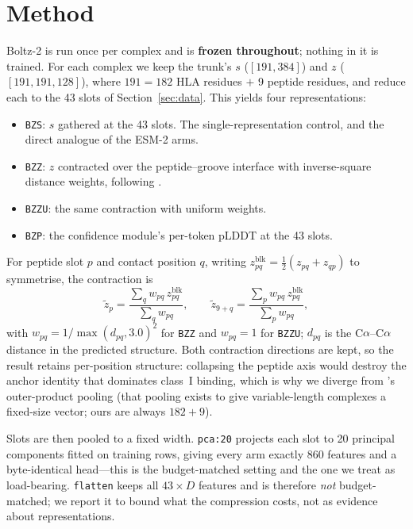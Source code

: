 \documentclass[11pt,a4paper]{article}
\newcommand{\armbzs}{\texttt{BZS}}
\newcommand{\armbzz}{\texttt{BZZ}}
\newcommand{\armbzzu}{\texttt{BZZU}}
\newcommand{\armbzp}{\texttt{BZP}}
\begin{document}
\section{Method}
\label{sec:method}

Boltz-2 is run once per complex and is \textbf{frozen throughout}; nothing in it
is trained. For each complex we keep the trunk's $s$ ($[191, 384]$) and $z$
($[191, 191, 128]$), where $191 = 182$ HLA residues $+$ 9 peptide residues, and
reduce each to the 43 slots of Section~\ref{sec:data}. This yields four
representations:

\begin{itemize}
  \item \armbzs{}: $s$ gathered at the 43 slots. The single-representation
        control, and the direct analogue of the ESM-2 arms.
  \item \armbzz{}: $z$ contracted over the peptide--groove interface with
        inverse-square distance weights, following \citet{prefolddg}.
  \item \armbzzu{}: the same contraction with uniform weights.
  \item \armbzp{}: the confidence module's per-token pLDDT at the 43 slots.
\end{itemize}

For peptide slot $p$ and contact position $q$, writing
$z^{\mathrm{blk}}_{pq} = \tfrac{1}{2}(z_{p q} + z_{q p})$ to symmetrise, the
contraction is
\begin{equation}
  \tilde z_p = \frac{\sum_q w_{pq}\, z^{\mathrm{blk}}_{pq}}{\sum_q w_{pq}},
  \qquad
  \tilde z_{9+q} = \frac{\sum_p w_{pq}\, z^{\mathrm{blk}}_{pq}}{\sum_p w_{pq}},
\end{equation}
with $w_{pq} = 1/\max(d_{pq}, 3.0)^2$ for \armbzz{} and $w_{pq} = 1$ for
\armbzzu{}; $d_{pq}$ is the C$\alpha$--C$\alpha$ distance in the predicted
structure. Both contraction directions are kept, so the result retains
per-position structure: collapsing the peptide axis would destroy the anchor
identity that dominates class~I binding, which is why we diverge from
\citet{prefolddg}'s outer-product pooling (that pooling exists to give
variable-length complexes a fixed-size vector; ours are always $182 + 9$).

Slots are then pooled to a fixed width. \texttt{pca:20} projects each slot to 20
principal components fitted on training rows, giving every arm exactly 860
features and a byte-identical head---this is the budget-matched setting and the
one we treat as load-bearing. \texttt{flatten} keeps all $43 \times D$ features
and is therefore \emph{not} budget-matched; we report it to bound what the
compression costs, not as evidence about representations.
\end{document}
